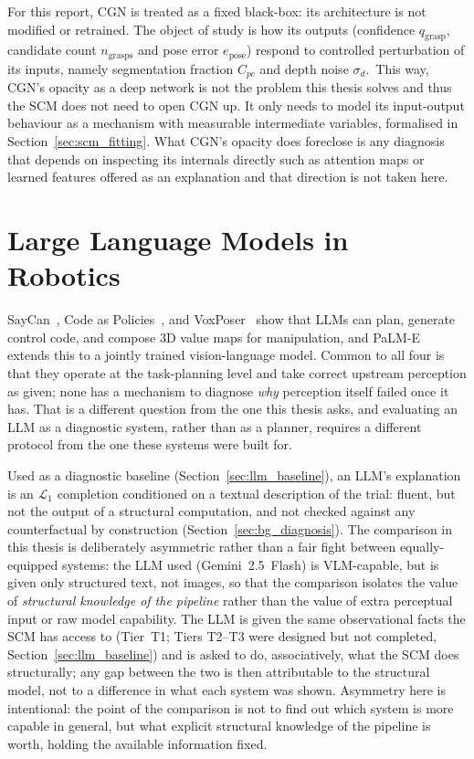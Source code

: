 \documentclass[11pt,a4paper]{report}
\begin{document}
\noindent For this report, CGN is treated as a fixed black-box: its architecture is not modified or retrained. The object of study is how its outputs (confidence $q_{\text{grasp}}$, candidate count $n_{\text{grasps}}$ and pose error $e_{\text{pose}}$) respond to controlled perturbation of its inputs, namely segmentation fraction $C_{pc}$ and depth noise $\sigma_d$.~This way, CGN's opacity as a deep network is not the problem this thesis solves and thus the SCM does not need to open CGN up. It only needs to model its input-output behaviour as a mechanism with measurable intermediate variables, formalised in Section~\ref{sec:scm_fitting}. What CGN's opacity does foreclose is any diagnosis that depends on inspecting its internals directly such as attention maps or learned features offered as an explanation and that direction is not taken here.

\section{Large Language Models in Robotics}
\label{sec:bg_llm}

SayCan~\cite{ahn2022saycan}, Code as Policies~\cite{liang2023code}, and VoxPoser~\cite{huang2023voxposer} show that LLMs can plan, generate control code, and compose 3D value maps for manipulation, and PaLM-E~\cite{driess2023palm} extends this to a jointly trained vision-language model. Common to all four is that they operate at the task-planning level and take correct upstream perception as given; none has a mechanism to diagnose \emph{why} perception itself failed once it has. That is a different question from the one this thesis asks, and evaluating an LLM as a diagnostic system, rather than as a planner, requires a different protocol from the one these systems were built for.

Used as a diagnostic baseline (Section~\ref{sec:llm_baseline}), an LLM's explanation is an $\mathcal{L}_1$ completion conditioned on a textual description of the trial: fluent, but not the output of a structural computation, and not checked against any counterfactual by construction (Section~\ref{sec:bg_diagnosis}). The comparison in this thesis is deliberately asymmetric rather than a fair fight between equally-equipped systems: the LLM used (Gemini~2.5~Flash) is VLM-capable, but is given only structured text, not images, so that the comparison isolates the value of \emph{structural knowledge of the pipeline} rather than the value of extra perceptual input or raw model capability. The LLM is given the same observational facts the SCM has access to (Tier~T1; Tiers T2--T3 were designed but not completed, Section~\ref{sec:llm_baseline}) and is asked to do, associatively, what the SCM does structurally; any gap between the two is then attributable to the structural model, not to a difference in what each system was shown. Asymmetry here is intentional: the point of the comparison is not to find out which system is more capable in general, but what explicit structural knowledge of the pipeline is worth, holding the available information fixed.
\end{document}
